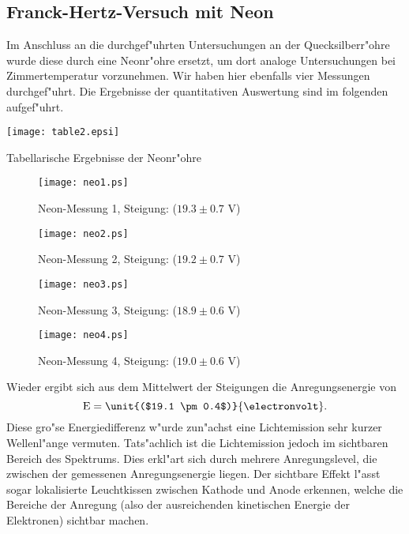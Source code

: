 \documentclass[a4paper,10pt]{article}
\begin{document}
\subsection{Franck-Hertz-Versuch mit Neon}
Im Anschluss an die durchgef"uhrten Untersuchungen an der Quecksilberr"ohre wurde diese durch eine Neonr"ohre ersetzt, um dort analoge Untersuchungen bei Zimmertemperatur vorzunehmen. Wir haben hier ebenfalls vier Messungen durchgef"uhrt. Die Ergebnisse der quantitativen Auswertung sind im folgenden aufgef"uhrt.
\begin{table}[ht]
	\centering
	\texttt{[image: table2.epsi]}
	\caption{Tabellarische Ergebnisse der Neonr"ohre}
	\label{table2}
\end{table}
\begin{figure}[ht]
	\centering
	\texttt{[image: neo1.ps]}
	\caption{Neon-Messung 1, Steigung: ($19.3 \pm 0.7$ V)}
	\label{neo1}
\end{figure}
\begin{figure}[ht]
	\centering
	\texttt{[image: neo2.ps]}
	\caption{Neon-Messung 2, Steigung: ($19.2 \pm 0.7$ V)}
	\label{neo2}
\end{figure}
\begin{figure}[ht]
	\centering
	\texttt{[image: neo3.ps]}
	\caption{Neon-Messung 3, Steigung: ($18.9 \pm 0.6$ V)}
	\label{neo3}
\end{figure}
\begin{figure}[ht]
	\centering
	\texttt{[image: neo4.ps]}
	\caption{Neon-Messung 4, Steigung: ($19.0 \pm 0.6$ V)}
	\label{neo4}
\end{figure}
\clearpage
Wieder ergibt sich aus dem Mittelwert der Steigungen die Anregungsenergie von
$$
\text{E}=\unit{($19.1 \pm 0.4$)}{\electronvolt}.
$$
Diese gro"se Energiedifferenz w"urde zun"achst eine Lichtemission sehr kurzer Wellenl"ange vermuten. Tats"achlich ist die Lichtemission jedoch im sichtbaren Bereich des Spektrums. Dies erkl"art sich durch mehrere Anregungslevel, die zwischen der gemessenen Anregungsenergie liegen. Der sichtbare Effekt l"asst sogar lokalisierte Leuchtkissen zwischen Kathode und Anode erkennen, welche die Bereiche der Anregung (also der ausreichenden kinetischen Energie der Elektronen) sichtbar machen.
\end{document}
